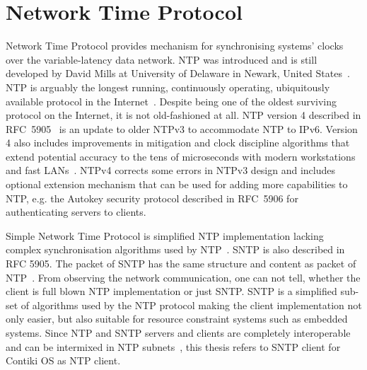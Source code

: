 
\chapter{Network Time Protocol}
Network Time Protocol provides mechanism for synchronising systems' clocks over the variable-latency data network.
NTP was introduced and is still developed by David Mills at University of Delaware in Newark, United States~\cite{ntp-history}.
NTP is arguably the longest running, continuously operating,
ubiquitously available protocol in the Internet~\cite{ntp-overview}.
Despite being one of the oldest surviving protocol on the Internet, it is not old-fashioned at all.
NTP version 4 described in RFC~5905~\cite{rfc5905} is an update to older NTPv3 to accommodate NTP to IPv6.
Version 4 also includes improvements in
mitigation and clock discipline algorithms that extend
potential accuracy to the tens of microseconds with modern
workstations and fast LANs~\cite{rfc5905}.
NTPv4 corrects some
errors in NTPv3 design and includes optional extension mechanism
that can be used for adding more capabilities to NTP, e.g. the
Autokey security protocol described in RFC~5906
for authenticating servers to clients.

Simple Network Time Protocol is simplified NTP implementation lacking complex
synchronisation algorithms used by NTP~\cite{rfc5905}.
SNTP is also described in RFC 5905.
The packet of SNTP has the same structure and content as packet of NTP~\cite{rfc5905}.
From observing the network communication, one can not tell, whether the client
is full blown NTP implementation or just SNTP.
SNTP is a simplified sub-set of algorithms used by the NTP protocol
making the client implementation not only easier, but also suitable for
resource constraint systems such as embedded systems.
Since NTP and SNTP servers and clients are
completely interoperable and can be intermixed in NTP subnets~\cite{rfc5905},
this thesis refers to SNTP client for Contiki OS as NTP client.









